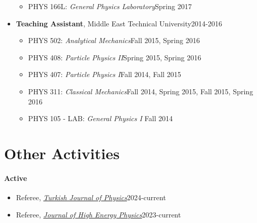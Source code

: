 \documentclass[a4paper,11pt]{article}
\begin{document}
\begin{itemize}[noitemsep,nolistsep]
\begin{itemize}
		\item[] PHYS 166L: \emph{General Physics Laboratory}\hfill Spring 2017\hspace*{2.2em}\vspace*{-.3em}
	\end{itemize} 
	\item[] \textbf{Teaching Assistant}, Middle East Technical University\hfill 2014-2016
	\vspace*{-.3em}
	\begin{itemize}
	\item[] PHYS 502: \emph{Analytical Mechanics}\hfill Fall 2015, Spring 2016\hspace*{2.2em}\vspace*{-.3em}
	\item[] PHYS 408: \emph{Particle Physics II}\hfill Spring 2015, Spring 2016\hspace*{2.2em}\vspace*{-.3em}
	\item[] PHYS 407: \emph{Particle Physics I}\hfill Fall 2014, Fall 2015\hspace*{2.2em}\vspace*{-.3em}
	\item[] PHYS 311: \emph{Classical Mechanics}\hfill Fall 2014, Spring 2015, Fall 2015, Spring 2016\hspace*{2.2em}\vspace*{-.3em}
	\item[] PHYS 105 - LAB: \emph{General Physics I} \hfill Fall 2014\hspace*{2.2em}\vspace*{-.3em}
	\end{itemize}
\end{itemize}

\section{\textcolor{burntorange}{Other Activities}}
\paragraph{Active}
\begin{itemize}
    \item[] Referee, \emph{\hyperref{https://journals.tubitak.gov.tr/physics/}{}{}{Turkish Journal of Physics}}\hfill 2024-current\hspace*{2.2em}
	\item[] Referee, \emph{\hyperref{https://jhep.sissa.it/}{}{}{Journal of High Energy Physics}}\hfill 2023-current
\end{itemize}
\end{document}
